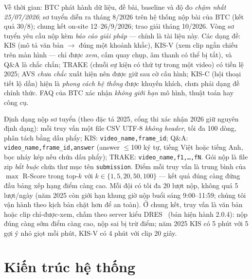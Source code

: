 \documentclass{ai_conquer2026}
\begin{document}
Về thời gian: BTC phát hành dữ liệu, đề bài, baseline và độ đo \emph{chậm nhất 25/07/2026};
sơ tuyển diễn ra tháng 8/2026 trên hệ thống nộp bài của BTC (kết quả 30/8); chung kết on-site 12--26/9/2026;
trao giải tháng 10/2026. Vòng sơ tuyển yêu cầu nộp kèm \emph{báo cáo giải pháp} --- chính là
tài liệu này. Các dạng đề: KIS (mô tả văn bản $\rightarrow$ đúng một khoảnh khắc),
KIS-V (xem clip ngắn chiếu trên màn hình --- chỉ được \emph{xem}, cấm quay chụp, âm thanh
có thể bị tắt), và Q\&A là chắc chắn; TRAKE (chuỗi sự kiện có thứ tự trong một video)
có tiền lệ 2025; AVS \emph{chưa chắc} xuất hiện nên được giữ sau cờ cấu hình; KIS-C
(hội thoại tiết lộ dần) hiện là \emph{phong cách hệ thống} được khuyến khích, chưa phải
dạng đề chính thức. FAQ của BTC xác nhận \emph{không giới hạn} mô hình, thuật toán
hay công cụ.

Định dạng nộp sơ tuyển (theo đặc tả 2025, cổng thi xác nhận 2026 giữ nguyên định dạng):
mỗi truy vấn một file CSV UTF-8 \emph{không header}, tối đa 100 dòng, phân tách bằng dấu phẩy;
KIS: \texttt{video\_name,frame\_id}; Q\&A: \texttt{video\_name,frame\_id,answer} (answer
$\le$100 ký tự, tiếng Việt hoặc tiếng Anh, bọc nháy kép nếu chứa dấu phẩy); TRAKE:
\texttt{video\_name,f1,\ldots,fN}. Gói nộp là file zip \emph{bắt buộc} chứa thư mục tên
\texttt{submission}. Điểm mỗi truy vấn là trung bình của $\max$ R-Score trong top-$k$ với
$k\in\{1,5,20,50,100\}$ --- kết quả đúng càng đứng đầu bảng xếp hạng điểm càng cao. Mỗi đội
có tối đa 20 lượt nộp, không quá 5 lượt/ngày (năm 2025 còn giới hạn khung giờ nộp buổi sáng
9:00--11:59; chúng tôi vận hành theo kịch bản chặt hơn để an toàn). Ở chung kết, truy vấn là
văn bản hoặc clip chỉ-được-xem, chấm theo server kiểu DRES~\cite{rossetto2021dres}
(bản hiện hành 2.0.4): nộp đúng càng sớm điểm càng cao, nộp sai bị trừ điểm; năm 2025 KIS có
5 phút với 5 gợi ý nhỏ giọt mỗi phút, KIS-V có 4 phút với clip 20 giây.

\section{Kiến trúc hệ thống}
\end{document}
